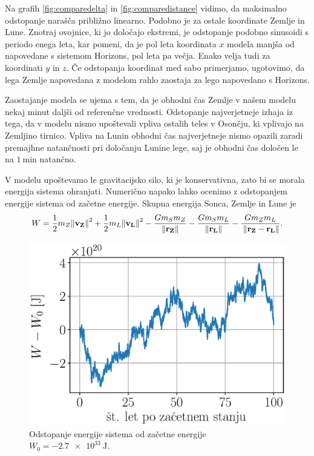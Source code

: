 \documentclass[a4paper,12pt]{article}
\renewcommand{\vec}[1]{\mathbf{#1}} %
\begin{document}
\noindent
Na grafih \ref{fig:comparedelta} in \ref{fig:comparedistance} vidimo, da 
maksimalno odstopanje narašča približno linearno. Podobno je za ostale 
koordinate Zemlje in Lune. Znotraj ovojnice, ki jo določajo ekstremi, je 
odstopanje podobno sinusoidi s periodo enega leta, kar pomeni, da je pol leta 
koordinata $x$ modela manjša od napovedane s sistemom Horizons, pol leta pa 
večja. Enako velja tudi za koordinati $y$ in $z$. Če odstopanja koordinat med 
sabo primerjamo, ugotovimo, da lega Zemlje napovedana z modelom rahlo zaostaja 
za lego napovedano s Horizons.

Zaostajanje modela se ujema s tem, da je obhodni čas Zemlje v našem modelu
nekaj minut daljši od referenčne vrednosti. Odstopanje najverjetneje izhaja iz 
tega, da v modelu nismo upoštevali vpliva ostalih teles v Osončju, ki vplivajo
na Zemljino tirnico. Vpliva na Lunin obhodni čas najverjetneje nismo opazili 
zaradi premajhne natančnosti pri določanju Lunine lege, saj je obhodni čas
določen le na $\SI{1}{\minute}$ natančno.

\newpage 

\noindent
V modelu upoštevamo le gravitacijsko silo, ki je konservativna, zato bi se 
morala energija sistema ohranjati. Numerično napako lahko ocenimo z odstopanjem 
energije sistema od začetne energije. Skupna energija Sonca, Zemlje in Lune je
\begin{equation*}
    W = \frac{1}{2}m_Z\norm{\vec{v_Z}}^2 + \frac{1}{2}m_L\norm{\vec{v_L}}^2 -
    \frac{Gm_Sm_Z}{\norm{\vec{r_Z}}} - \frac{Gm_Sm_L}{\norm{\vec{r_L}}} 
    - \frac{Gm_Zm_L}{\: \norm{\vec{r_Z}-\vec{r_L}}}.
\end{equation*}

\begin{figure}[ht!]
    \centering
    \includegraphics[scale=0.55]{slikep/energija.eps}
    \caption{Odstopanje energije sistema od začetne energije 
    $W_0=\SI{-2.7e33}{\joule}$.}
\end{figure}
\end{document}
